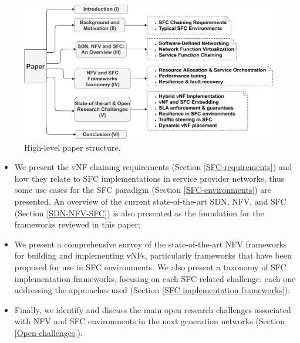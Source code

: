 \documentclass[futureinternet,review,accept,pdftex,moreauthors]{Definitions/mdpi}
\begin{document}
\begin{figure}[H]%
\includegraphics[width=0.9\columnwidth]{Paper_Structure.pdf}
\caption{High-level paper structure.}
\label{Paper-Structure}
\end{figure}
\begin{itemize}
    \item We present the vNF chaining requirements (Section \ref{SFC-requirements}) and how they relate to SFC implementations in service provider networks, thus some use cases for the SFC paradigm (Section \ref{SFC-environments}) are presented. An overview of the current state-of-the-art SDN, NFV, and SFC (Section \ref{SDN-NFV-SFC}) is also presented as the foundation for the frameworks reviewed in this paper;
    
    \item We present a comprehensive survey of the state-of-the-art NFV frameworks for building and implementing vNFs, particularly frameworks that have been proposed for use in SFC environments. We also present a taxonomy of SFC implementation frameworks,  focusing on each SFC-related challenge, each one addressing the approaches used (Section \ref{SFC implementation frameworks}); %
    
    \item Finally, we identify and discuss the main open research challenges associated with NFV and SFC environments in the next generation networks (Section \ref{Open-challenges}). 
\end{itemize} 
\end{document}
